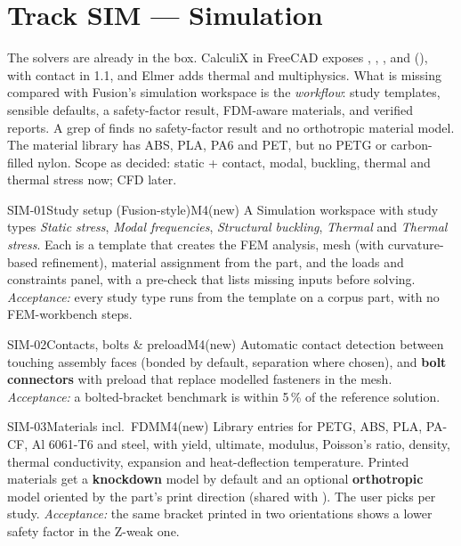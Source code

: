 \section{Track SIM --- Simulation}\label{sec:sim}

The solvers are already in the box. CalculiX in FreeCAD exposes , ,
,  and  (), with contact in
1.1, and Elmer adds thermal and multiphysics. What is missing compared with Fusion's simulation workspace is
the \emph{workflow}: study templates, sensible defaults, a safety-factor result, FDM-aware materials, and
verified reports. A grep of  finds no safety-factor result and no orthotropic material
model. The material library has ABS, PLA, PA6 and PET, but no PETG or carbon-filled nylon.
Scope as decided: static + contact, modal, buckling, thermal and thermal stress now; CFD later.

\begin{epic}{SIM-01}{Study setup (Fusion-style)}{M4}{\stDone}{(new)}
A Simulation workspace with study types \emph{Static stress}, \emph{Modal frequencies},
\emph{Structural buckling}, \emph{Thermal} and \emph{Thermal stress}. Each is a template that creates the
FEM analysis, mesh (with curvature-based refinement), material assignment from the part, and the loads and
constraints panel, with a pre-check that lists missing inputs before solving.
\emph{Acceptance:} every study type runs from the template on a corpus part, with no FEM-workbench steps.
\end{epic}

\begin{epic}{SIM-02}{Contacts, bolts \& preload}{M4}{\stTodo}{(new)}
Automatic contact detection between touching assembly faces (bonded by default, separation where chosen),
and \textbf{bolt connectors} with preload that replace modelled fasteners in the mesh.
\emph{Acceptance:} a bolted-bracket benchmark is within 5\,\% of the reference solution.
\end{epic}

\begin{epic}{SIM-03}{Materials incl.\ FDM}{M4}{\stTodo}{(new)}
Library entries for PETG, ABS, PLA, PA-CF, Al 6061-T6 and steel, with yield, ultimate, modulus,
Poisson's ratio, density, thermal conductivity, expansion and heat-deflection temperature. Printed materials get
a \textbf{knockdown} model by default and an optional \textbf{orthotropic} model oriented by the part's print
direction (shared with ). The user picks per study.
\emph{Acceptance:} the same bracket printed in two orientations shows a lower safety factor in the Z-weak one.
\end{epic}

